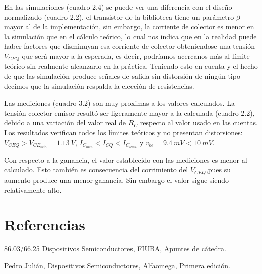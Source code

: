 \documentclass[a4paper, 10pt, spanish]{article}
\numberwithin{equation}{section}
\numberwithin{table}{section}
\begin{document}
En las simulaciones (cuadro 2.4) se puede ver una diferencia con el diseño normalizado (cuadro 2.2), el transistor de la biblioteca tiene un parámetro $\beta$ mayor al de la implementación, sin embargo, la corriente de colector es menor en la simulación que en el cálculo teórico, lo cual nos indica que en la realidad puede haber factores que disminuyan esa corriente de colector obteniendose una tensión $V_{CEQ}$ que será mayor a la esperada, es decir, podríamos acercanos más al límite teórico sin realmente alcanzarlo en la práctica. Teniendo esto en cuenta y el hecho de que las simulación produce señales de salida sin distorsión de ningún tipo decimos que la simulación respalda la elección de resistencias.

Las mediciones (cuadro 3.2) son muy proximas a los valores calculados. La tensión colector-emisor resultó ser ligeramente mayor a la calculada (cuadro 2.2), debido a una variación del valor real de $R_C$ respecto al valor usado en las cuentas. Los resultados verifican todos los límites teóricos y no presentan distorsiones: $V_{CEQ} > V_{CE}_{min} = 1.13\ V$, $I_C_{min} < I_{CQ} < I_{C}_{max}$ y $v_{be} = 9.4\ mV < 10\ mV$.

Con respecto a la ganancia, el valor establecido con las mediciones es menor al calculado. Esto también es consecuencia del corrimiento del $V_{CEQ}$,pues su aumento produce una menor ganancia. Sin embargo el valor sigue siendo relativamente alto.

\section{Referencias}
\begin{enumerate}[{[}1{]}]
  \item 86.03/66.25 Dispositivos Semiconductores, FIUBA, Apuntes de cátedra.
  \item Pedro Julián, Dispositivos Semiconductores, Alfaomega, Primera edición.
\end{enumerate}
\end{document}
